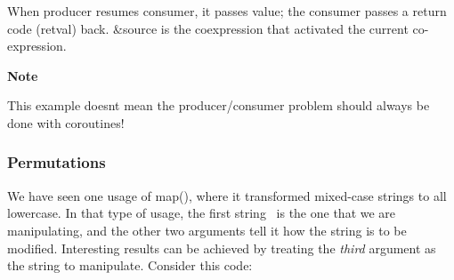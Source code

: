 
When producer resumes consumer, it passes \textsf{value}; the consumer
passes a return code (\textsf{retval}) back. \textsf{\&source} is the
coexpression that activated the current co-expression.

{\sffamily\bfseries
Note}

{\sffamily
This example doesn{\textquotesingle}t mean the producer/consumer problem
should always be done with coroutines!}

\subsubsection[Permutations]{Permutations}

We have seen one usage of
\textsf{map()}, where it transformed mixed-case strings to
all lowercase. In that type of usage, the first string \ is the one
that we are manipulating, and the other two arguments tell it how the
string is to be modified. Interesting results can be achieved by
treating the \textit{third} argument as the string to manipulate.
Consider this code:

